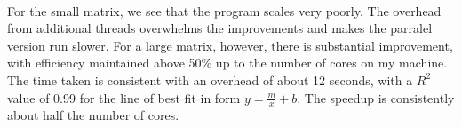 \documentclass{article}
\begin{document}
\\
For the small matrix, we see that the program scales very poorly. The overhead from additional threads overwhelms the improvements and makes the parralel version run slower. For a large matrix, however, there is substantial improvement, with efficiency maintained above 50\% up to the number of cores on my machine. The time taken is consistent with an overhead of about 12 seconds, with a $R^2$ value of 0.99 for the line of best fit in form $y=\frac{m}{x}+b$. The speedup is consistently about half the number of cores.
\end{document}
